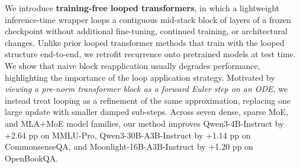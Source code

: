 We introduce \textbf{training-free looped transformers}, in which a lightweight inference-time wrapper loops a contiguous mid-stack block of layers of a frozen checkpoint without additional fine-tuning, continued training, or architectural changes. Unlike prior looped transformer methods that train with the looped structure end-to-end, we retrofit recurrence onto pretrained models at test time. We show that naive block reapplication usually degrades performance, highlighting the importance of the loop application strategy. Motivated by \emph{viewing a pre-norm transformer block as a forward Euler step on an ODE}, we instead treat looping as a refinement of the same approximation, replacing one large update with smaller damped sub-steps. Across seven dense, sparse MoE, and MLA+MoE model families, our method improves Qwen3-4B-Instruct by +2.64 pp on MMLU-Pro, Qwen3-30B-A3B-Instruct by +1.14 pp on CommonsenseQA, and Moonlight-16B-A3B-Instruct by +1.20 pp on OpenBookQA.